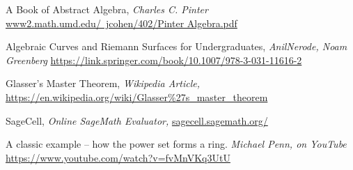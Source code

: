 \documentclass[12pt, oneside]{book}
\begin{document}
\begin{thebibliography}{9}
	
 A Book of Abstract Algebra, \textit{Charles C. Pinter}
\href{http://www2.math.umd.edu/~jcohen/402/Pinter%20Algebra.pdf}{www2.math.umd.edu/~jcohen/402/Pinter Algebra.pdf}

 Algebraic Curves and Riemann Surfaces for Undergraduates, \textit{AnilNerode, Noam Greenberg}
\href{https://link.springer.com/book/10.1007/978-3-031-11616-2}{https://link.springer.com/book/10.1007/978-3-031-11616-2}

 Glasser's Master Theorem, \textit{Wikipedia Article,}
\href{https://en.wikipedia.org/wiki/Glasser%27s_master_theorem}
     {https://en.wikipedia.org/wiki/Glasser\%27s\_master\_theorem}

 SageCell, \textit{Online SageMath Evaluator,}
\href{https://sagecell.sagemath.org/}{sagecell.sagemath.org/}

 A classic example -- how the power set forms a ring. 
\textit{Michael Penn, on YouTube}
\href{https://www.youtube.com/watch?v=fvMnVKq3UtU}
     {https://www.youtube.com/watch?v=fvMnVKq3UtU}

\end{thebibliography}
\end{document}
